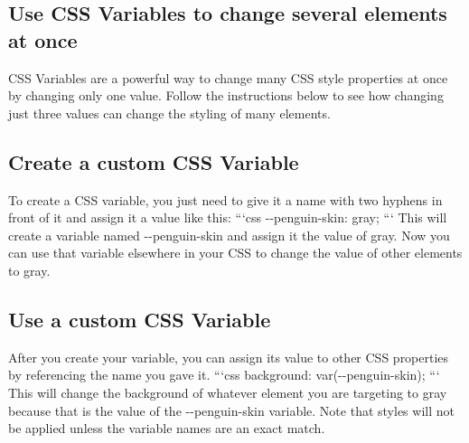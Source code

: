 \documentclass{article}%
\begin{document}
%
\subsection{Use CSS Variables to change several elements at once}%
\label{subsec:UseCSSVariablestochangeseveralelementsatonce}%
CSS Variables are a powerful way to change many CSS style properties at once by changing only one value.\newline%
Follow the instructions below to see how changing just three values can change the styling of many elements.\newline%

%
\subsection{Create a custom CSS Variable}%
\label{subsec:CreateacustomCSSVariable}%
To create a CSS variable, you just need to give it a name with two hyphens in front of it and assign it a value like this:\newline%
```css\newline%
{-}{-}penguin{-}skin: gray;\newline%
```\newline%
This will create a variable named {-}{-}penguin{-}skin and assign it the value of gray.\newline%
Now you can use that variable elsewhere in your CSS to change the value of other elements to gray.\newline%

%
\subsection{Use a custom CSS Variable}%
\label{subsec:UseacustomCSSVariable}%
After you create your variable, you can assign its value to other CSS properties by referencing the name you gave it.\newline%
```css\newline%
background: var({-}{-}penguin{-}skin);\newline%
```\newline%
This will change the background of whatever element you are targeting to gray because that is the value of the {-}{-}penguin{-}skin variable.\newline%
Note that styles will not be applied unless the variable names are an exact match.\newline%

%
\end{document}

